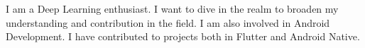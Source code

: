 


\begin{cvparagraph}

I am a Deep Learning enthusiast. I want to dive in the realm to 
broaden my understanding and contribution in the field. I am also involved in
Android Development. I have contributed to projects both in Flutter and 
Android Native.

\end{cvparagraph}
